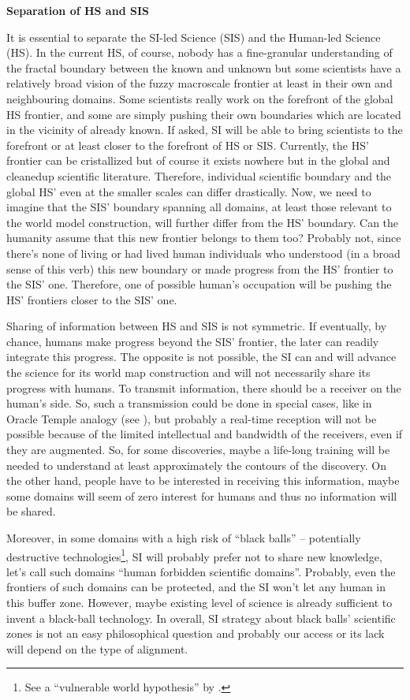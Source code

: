 \documentclass[a4paper,11pt]{article}
\begin{document}
\textbf{Separation of HS and SIS}

It is essential to separate the SI-led Science (SIS) and the Human-led Science (HS). In the current HS, of course, nobody has a fine-granular understanding of the fractal boundary between the known and unknown but some scientists have a relatively broad vision of the fuzzy macroscale frontier at least in their own and neighbouring domains. Some scientists really work on the forefront of the global HS frontier, and some are simply pushing their own boundaries which are located in the vicinity of already known. If asked, SI will be able to bring scientists to the forefront or at least closer to the forefront of HS or SIS. Currently, the HS' frontier can be cristallized but of course it exists nowhere but in the global and cleanedup scientific literature. Therefore, individual scientific boundary and the global HS' even at the smaller scales can differ drastically. Now, we need to imagine that the SIS' boundary spanning all domains, at least those relevant to the world model construction, will further differ from the HS' boundary. Can the humanity assume that this new frontier belongs to them too? Probably not, since there's none of living or had lived human individuals who understood (in a broad sense of this verb) this new boundary or made progress from the HS' frontier to the SIS' one. Therefore, one of possible human's occupation will be pushing the HS' frontiers closer to the SIS' one.

Sharing of information between HS and SIS is not symmetric. If eventually, by chance, humans make progress beyond the SIS' frontier, the later can readily integrate this progress. The opposite is not possible, the SI can and will advance the science for its world map construction and will not necessarily share its progress with humans. To transmit information, there should be a receiver on the human's side. So, such a transmission could be done in special cases, like in Oracle Temple analogy (see ), but probably a real-time reception will not be possible because of the limited intellectual and bandwidth of the receivers, even if they are augmented. So, for some discoveries, maybe a life-long training will be needed to understand at least approximately the contours of the discovery. On the other hand, people have to be interested in receiving this information, maybe some domains will seem of zero interest for humans and thus no information will be shared. 

Moreover, in some domains with a high risk of ``black balls'' -- potentially destructive technologies\footnote{See a ``vulnerable world hypothesis'' by \textcite{VulnerableWorldHypothesis}.}, SI will probably prefer not to share new knowledge, let's call such domains ``human forbidden scientific domains''. Probably, even the frontiers of such domains can be protected, and the SI won't let any human in this buffer zone. However, maybe existing level of science is already sufficient to invent a black-ball technology. In overall, SI strategy about black balls' scientific zones is not an easy philosophical question and probably our access or its lack will depend on the type of alignment. 
\end{document}
